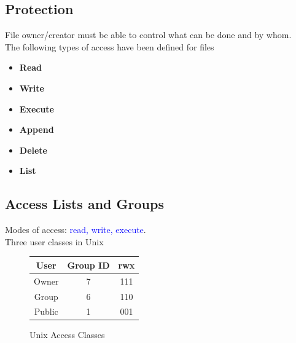 \documentclass{book/custombook}
\begin{document}
            \subsection{Protection}
                File owner/creator must be able to control what can be done and by whom.\\
                The following types of access have been defined for files
                \begin{itemize}
                    \item \textbf{Read}
                    \item \textbf{Write}
                    \item \textbf{Execute}
                    \item \textbf{Append}
                    \item \textbf{Delete}
                    \item \textbf{List}
                \end{itemize}
            \subsection{Access Lists and Groups}
                Modes of access: \textcolor{blue}{read, write, execute}.\\
                Three user classes in Unix
                \begin{figure}[H]
                    \centering
                    \begin{tabular}{ccc}
                        \textbf{User} & \textbf{Group ID} & \textbf{rwx} \\
                        \toprule
                        Owner & 7 & 111 \\
                        Group & 6 & 110 \\
                        Public & 1 & 001 \\
                    \end{tabular}
                    \caption{Unix Access Classes}
                \end{figure}
\end{document}
